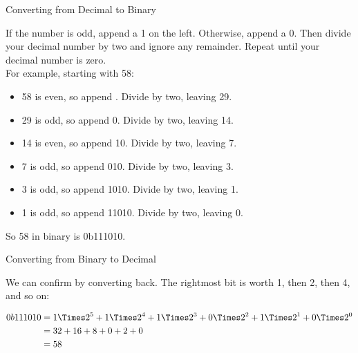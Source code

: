 \begin{frame}{Converting from Decimal to Binary}

    If the number is odd, append a 1 on the left. Otherwise, append a 0. Then
    divide your decimal number by two and ignore any remainder. Repeat until your
    decimal number is zero. \\

    For example, starting with 58:

    \begin{itemize}
        \item 58 is even, so append . Divide by two, leaving 29.
        \item 29 is odd, so append 0. Divide by two, leaving 14.
        \item 14 is even, so append 10. Divide by two, leaving 7.
        \item 7 is odd, so append 010. Divide by two, leaving 3.
        \item 3 is odd, so append 1010. Divide by two, leaving 1.
        \item 1 is odd, so append 11010. Divide by two, leaving 0.
    \end{itemize}

    So 58 in binary is 0b111010.

\end{frame}

\begin{frame}{Converting from Binary to Decimal}

    We can confirm by converting back. The rightmost bit is worth 1, then 2, then
    4, and so on:

    \begin{align*}
        0b111010 & =
        1 \Times 2^5 +
        1 \Times 2^4 +
        1 \Times 2^3 +
        0 \Times 2^2 +
        1 \Times 2^1 +
        0 \Times 2^0                          \\
                 & = 32 + 16  + 8 + 0 + 2 + 0 \\
                 & = 58
    \end{align*}

\end{frame}

